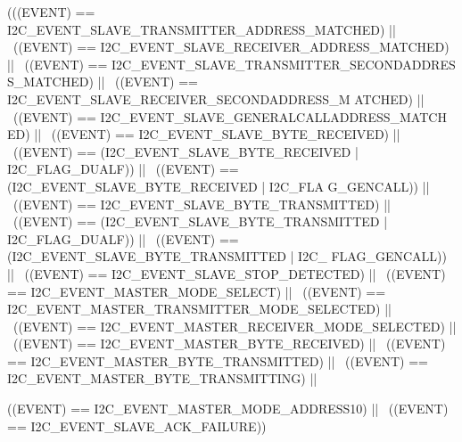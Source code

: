 \begin{DoxyCode}
(((EVENT) == I2C_EVENT_SLAVE_TRANSMITTER_ADDRESS_MATCHED) || \
                             ((EVENT) == 
      I2C_EVENT_SLAVE_RECEIVER_ADDRESS_MATCHED) || \
                             ((EVENT) == I2C_EVENT_SLAVE_TRANSMITTER_SECONDADDRES
      S_MATCHED) || \
                             ((EVENT) == I2C_EVENT_SLAVE_RECEIVER_SECONDADDRESS_M
      ATCHED) || \
                             ((EVENT) == I2C_EVENT_SLAVE_GENERALCALLADDRESS_MATCH
      ED) || \
                             ((EVENT) == I2C_EVENT_SLAVE_BYTE_RECEIVED) || \
                             ((EVENT) == (I2C_EVENT_SLAVE_BYTE_RECEIVED | 
      I2C_FLAG_DUALF)) || \
                             ((EVENT) == (I2C_EVENT_SLAVE_BYTE_RECEIVED | I2C_FLA
      G_GENCALL)) || \
                             ((EVENT) == I2C_EVENT_SLAVE_BYTE_TRANSMITTED) || \
                             ((EVENT) == (I2C_EVENT_SLAVE_BYTE_TRANSMITTED | 
      I2C_FLAG_DUALF)) || \
                             ((EVENT) == (I2C_EVENT_SLAVE_BYTE_TRANSMITTED | I2C_
      FLAG_GENCALL)) || \
                             ((EVENT) == I2C_EVENT_SLAVE_STOP_DETECTED) || \
                             ((EVENT) == I2C_EVENT_MASTER_MODE_SELECT) || \
                             ((EVENT) == 
      I2C_EVENT_MASTER_TRANSMITTER_MODE_SELECTED) || \
                             ((EVENT) == I2C_EVENT_MASTER_RECEIVER_MODE_SELECTED)
       || \
                             ((EVENT) == I2C_EVENT_MASTER_BYTE_RECEIVED) || \
                             ((EVENT) == I2C_EVENT_MASTER_BYTE_TRANSMITTED) || \
                             ((EVENT) == I2C_EVENT_MASTER_BYTE_TRANSMITTING) || \
      
                             ((EVENT) == I2C_EVENT_MASTER_MODE_ADDRESS10) || \
                             ((EVENT) == I2C_EVENT_SLAVE_ACK_FAILURE))
\end{DoxyCode}
